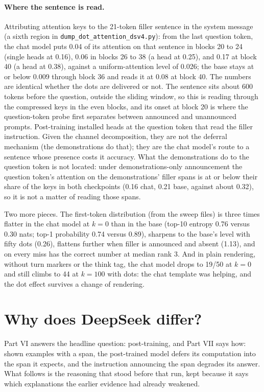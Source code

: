 \documentclass[11pt]{article}
\newcommand{\ttt}[1]{\texttt{\small #1}}
\begin{document}
\paragraph{Where the sentence is read.} Attributing attention keys to the 21-token filler sentence in the system message (a sixth region in \ttt{dump\_dot\_attention\_dsv4.py}): from the last question token, the chat model puts 0.04 of its attention on that sentence in blocks 20 to 24 (single heads at 0.16), 0.06 in blocks 26 to 38 (a head at 0.25), and 0.17 at block 40 (a head at 0.38), against a uniform-attention level of 0.026; the base stays at or below 0.009 through block 36 and reads it at 0.08 at block 40. The numbers are identical whether the dots are delivered or not. The sentence sits about 600 tokens before the question, outside the sliding window, so this is reading through the compressed keys in the even blocks, and its onset at block 20 is where the question-token probe first separates between announced and unannounced prompts. Post-training installed heads at the question token that read the filler instruction. Given the channel decomposition, they are not the deferral mechanism (the demonstrations do that); they are the chat model's route to a sentence whose presence costs it accuracy. What the demonstrations do to the question token is not located: under demonstrations-only announcement the question token's attention on the demonstrations' filler spans is at or below their share of the keys in both checkpoints (0.16 chat, 0.21 base, against about 0.32), so it is not a matter of reading those spans.

Two more pieces. The first-token distribution (from the sweep files) is three times flatter in the chat model at $k=0$ than in the base (top-10 entropy 0.76 versus 0.30 nats; top-1 probability 0.74 versus 0.89), sharpens to the base's level with fifty dots (0.26), flattens further when filler is announced and absent (1.13), and on every miss has the correct number at median rank 3. And in plain rendering, without turn markers or the think tag, the chat model drops to 19/50 at $k=0$ and still climbs to 44 at $k=100$ with dots: the chat template was helping, and the dot effect survives a change of rendering.

\section{Why does DeepSeek differ?}

Part VI answers the headline question: post-training, and Part VII says how: shown examples with a span, the post-trained model defers its computation into the span it expects, and the instruction announcing the span degrades its answer. What follows is the reasoning that stood before that run, kept because it says which explanations the earlier evidence had already weakened.
\end{document}
